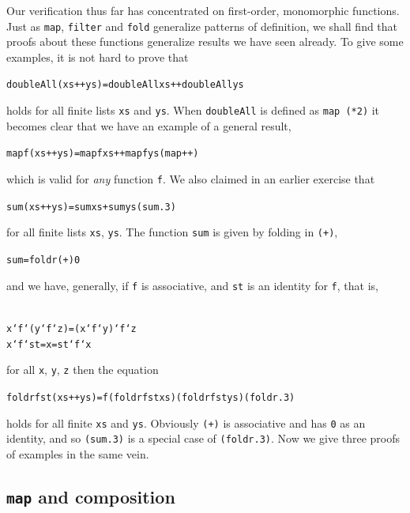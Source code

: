 Our verification thus far has concentrated on first-order, monomorphic
functions. Just as \texttt{map}, \texttt{filter} and \texttt{fold} generalize
patterns of definition, we shall find that proofs about these functions
generalize results we have seen already. To give some examples, it is
not hard to prove that
\begin{alltt}
doubleAll (xs++ys) = doubleAll xs ++ doubleAll ys
\end{alltt}
holds for all finite lists \texttt{xs} and \texttt{ys}.
When \texttt{doubleAll} is defined as \texttt{map (*2)} it becomes clear that we have an
example of a general result,
\begin{alltt}
map f (xs++ys) = map f xs ++ map f ys\hfill(map++)
\end{alltt}
which is valid for {\em any\/} function \texttt{f}.
We also claimed in an earlier exercise that
\begin{alltt}
sum (xs++ys) = sum xs + sum ys\hfill (sum.3)
\end{alltt}
for all finite lists \texttt{xs}, \texttt{ys}. The function \texttt{sum} is given by
folding in \texttt{(+)}, 
\begin{alltt}
sum = foldr (+) 0
\end{alltt}
and we have, generally,
if \texttt{f} is associative, and \texttt{st} is an identity for \texttt{f}, that is,
\begin{alltt}\label{assocId}
x `f` (y `f` z) = (x `f` y) `f` z
x `f` st = x = st `f` x
\end{alltt}
for all \texttt{x}, \texttt{y}, \texttt{z}
then the equation 
\begin{alltt}
foldr f st (xs++ys) = f (foldr f st xs) (foldr f st ys)\hfill (foldr.3)
\end{alltt}
holds for all finite \texttt{xs} and \texttt{ys}. Obviously \texttt{(+)} is associative and has
\texttt{0} as an identity, and so \texttt{(sum.3)} is a special case of
\texttt{(foldr.3)}.
Now we give three proofs of examples in the same vein.

\subsection*{\texttt{map} and composition}

